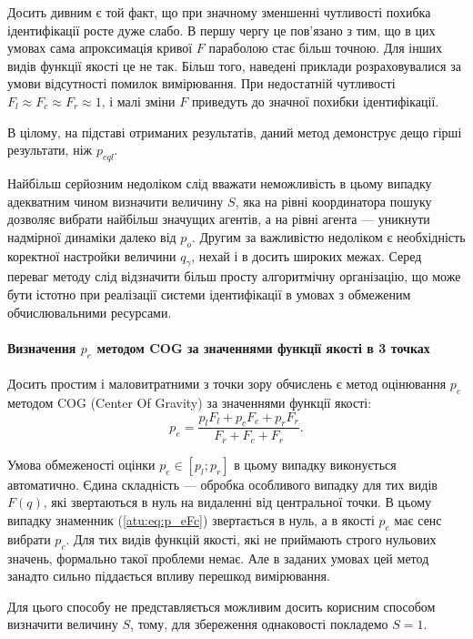 Досить дивним є той факт, що при значному зменшенні чутливості похибка
ідентифікації росте дуже слабо. В першу чергу це пов'язано з тим, що в цих
умовах сама апроксимація кривої $F$ параболою стає більш точною. Для інших
видів функції якості це не так. Більш того, наведені приклади розраховувалися
за умови відсутності помилок вимірювання. При недостатній чутливості
$F_l \approx F_c \approx F_r \approx 1$, і малі зміни $F$ приведуть до значної
похибки ідентифікації.

В цілому, на підставі отриманих результатів, даний метод демонструє дещо
гірші результати, ніж $p_{eql}$.

Найбільш серйозним недоліком слід вважати неможливість в цьому
випадку адекватним чином визначити величину
$S$, яка на рівні координатора пошуку дозволяє вибрати найбільш
значущих агентів, а на рівні агента --- уникнути надмірної
динаміки далеко від
$ p_o $. Другим за важливістю недоліком є необхідність коректної
настройки величини
$ q_\gamma $, нехай і в досить широких межах. Серед переваг методу
слід відзначити більш просту алгоритмічну організацію, що може
бути істотно при реалізації системи ідентифікації в умовах з
обмеженим обчислювальними ресурсами.



\paragraph{Визначення $ p_e $ методом COG за значеннями функції якості в 3 точках}

Досить простим і маловитратними з точки зору обчислень є метод оцінювання $p_e$ методом
COG (Center Of Gravity) за значеннями функції якості:
%
\begin{equation}
  p_e =
  \frac{p_l F_l + p_c F_c + p_r F_r}{ F_r + F_c + F_r}  .
  \label{atu:eq:p_eFc}
\end{equation}

Умова обмеженості оцінки $p_e \in [p_l; p_r]$ в цьому випадку виконується
автоматично.
Єдина складність --- обробка особливого випадку для тих видів
$F(q) $, які звертаються в нуль на видаленні від центральної
точки. В цьому випадку знаменник (\ref{atu:eq:p_eFc}) звертається в нуль,
а в якості $ p_e $ має сенс вибрати $ p_c $.
Для тих видів функцій якості, які не приймають строго
нульових значень, формально такої проблеми немає.
Але в заданих умовах цей метод занадто
сильно піддається впливу перешкод вимірювання.

Для цього способу не представляється можливим досить корисним
способом визначити величину
$ S $, тому, для збереження однаковості покладемо
$ S = 1 $.

